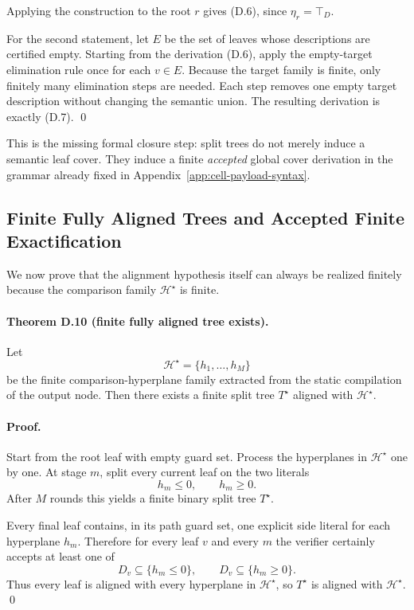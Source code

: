 Applying the construction to the root $r$ gives (D.6), since $\eta_r=\top_D$.

For the second statement, let $E$ be the set of leaves whose descriptions are certified empty. Starting from the derivation (D.6), apply the empty-target elimination rule once for each $v\in E$. Because the target family is finite, only finitely many elimination steps are needed. Each step removes one empty target description without changing the semantic union. The resulting derivation is exactly (D.7). \qed

This is the missing formal closure step: split trees do not merely induce a semantic leaf cover. They induce a finite \emph{accepted} global cover derivation in the grammar already fixed in Appendix~\ref{app:cell-payload-syntax}.

\subsection{Finite Fully Aligned Trees and Accepted Finite Exactification}

We now prove that the alignment hypothesis itself can always be realized finitely because the comparison family $\mathcal H^\star$ is finite.

\paragraph{Theorem D.10 (finite fully aligned tree exists).}
Let
\[
 \mathcal H^\star=\{h_1,\dots,h_M\}
\]
be the finite comparison-hyperplane family extracted from the static compilation of the output node. Then there exists a finite split tree $T^\star$ aligned with $\mathcal H^\star$.

\paragraph{Proof.}
Start from the root leaf with empty guard set. Process the hyperplanes in $\mathcal H^\star$ one by one. At stage $m$, split every current leaf on the two literals
\[
 h_m\le 0,
 \qquad
 h_m\ge 0.
\]
After $M$ rounds this yields a finite binary split tree $T^\star$.

Every final leaf contains, in its path guard set, one explicit side literal for each hyperplane $h_m$. Therefore for every leaf $v$ and every $m$ the verifier certainly accepts at least one of
\[
 D_v\subseteq\{h_m\le 0\},
 \qquad
 D_v\subseteq\{h_m\ge 0\}.
\]
Thus every leaf is aligned with every hyperplane in $\mathcal H^\star$, so $T^\star$ is aligned with $\mathcal H^\star$. \qed

